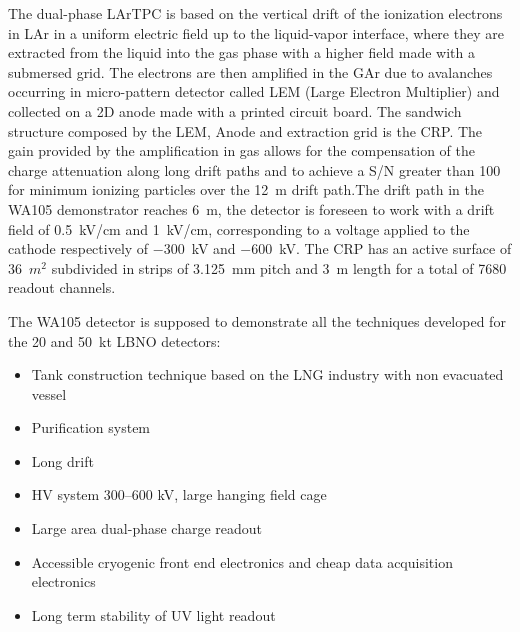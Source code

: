 The dual-phase LArTPC is based on the vertical drift of the
ionization electrons in LAr in a uniform electric field up to the
liquid-vapor interface, where they are extracted from the liquid into
the gas phase with a higher field made with a submersed grid. The
electrons are then amplified in the GAr due to avalanches occurring
in micro-pattern detector called LEM (Large Electron Multiplier) and
collected on a 2D anode made with a printed circuit board. The
sandwich structure composed by the LEM, Anode and extraction
grid is the CRP. The gain provided by the
amplification in gas allows for the compensation of the charge
attenuation along long drift paths and to achieve a S/N greater than
100 for minimum ionizing particles over the 12~m drift path.The drift path
in the WA105 demonstrator reaches 6~m, the detector is foreseen to
work with a drift field of 0.5~kV/cm and 1~kV/cm, corresponding to a
voltage applied to the cathode respectively of $-$300~kV and $-$600~kV. The
CRP has an active surface of 36~$m^2$ subdivided in strips of 3.125~mm
pitch and 3~m length for a total of 7680 readout channels.

The WA105 detector is supposed to demonstrate all the techniques developed for the 20 and 50~kt LBNO detectors:
\begin{itemize}
\item{Tank construction technique based on the LNG industry with non evacuated vessel}
\item{Purification system}
\item{Long drift}
\item{HV system 300--600 kV, large hanging field cage}
\item{Large area dual-phase charge readout}
\item{Accessible cryogenic front end electronics and cheap data acquisition electronics}
\item{Long term stability of UV light readout}
\end{itemize}

